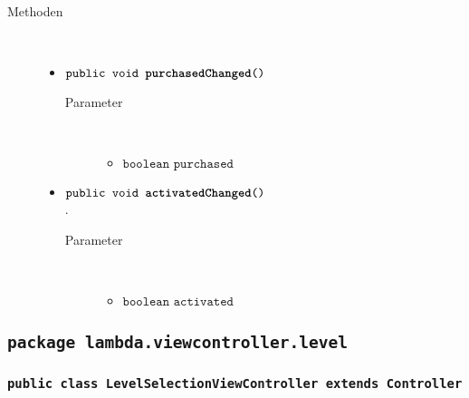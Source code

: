 \begin{description}
\item[Methoden] \hfill \\
	\vspace{-.8cm}
	\begin{itemize}
		\item $\texttt{public void \textbf{purchasedChanged}()}$ \\ 
			\begin{description}
			\item[Parameter] \hfill \\
			\vspace{-.8cm}
			\begin{itemize}
				\item $\texttt{boolean purchased}$ \\ 
			\end{itemize}
			\end{description}
		
		\item $\texttt{public void \textbf{activatedChanged}()}$ \\.
		\begin{description}
			\item[Parameter] \hfill \\
			\vspace{-.8cm}
			\begin{itemize}
				\item $\texttt{boolean activated}$ \\ 
			\end{itemize}
			\end{description}
			

		\end{itemize}
	\end{description}
	
\subsection{\texttt{package lambda.viewcontroller.level}}
	
	\subsubsection{\normalfont \texttt{public class \textbf{LevelSelectionViewController} extends Controller}}

